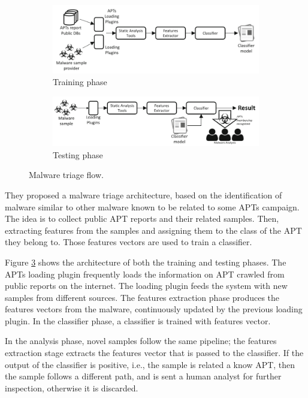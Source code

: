 \begin{figure}
	\centering
	\begin{subfigure}{1.0\textwidth}
		\centering		\includegraphics[width=1.0\linewidth]{train.png}  
		\caption{Training phase}
		\label{fig:sub-train}
	\end{subfigure}
	
	\begin{subfigure}{1.0\textwidth}
		\centering
		\includegraphics[width=1.0\linewidth]{test.png}  
		\caption{Testing phase}
		\label{fig:sub-test}
	\end{subfigure}
	
	\caption{Malware triage flow.}
	\label{fig:mal_triage}
\end{figure}

They proposed a malware triage architecture, based on the identification of malware similar to other malware known to be related to some APTs campaign. The idea is to collect public APT reports and their related samples.  Then, extracting features from the samples and assigning them to the class of the APT they belong to. Those features vectors are used to train a classifier.

Figure \ref{fig:mal_triage} shows the architecture of both the training and testing phases. The APTs loading plugin frequently loads the information on APT crawled from public reports on the internet. The loading plugin feeds the system with new samples from different sources. The features extraction phase produces the features vectors from the malware, continuously updated by the previous loading plugin. In the classifier phase, a classifier is trained with features vector. 

In the analysis phase, novel samples follow the same pipeline; the features extraction stage extracts the features vector that is passed to the classifier. If the output of the classifier is positive, i.e., the sample is related a know APT, then the sample follows a different path, and is sent a human analyst for further inspection, otherwise it is discarded.

